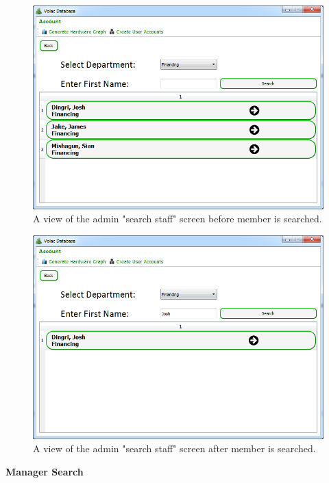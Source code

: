 \begin{figure}[H]
    \includegraphics[width=\textwidth]{./Evaluation/Images/beforeadv.png}
    \caption{A view of the admin "search staff" screen before member is searched.} 
\end{figure}

\begin{figure}[H]
    \includegraphics[width=\textwidth]{./Evaluation/Images/afteradv.png}
    \caption{A view of the admin "search staff" screen after member is searched.} 
\end{figure}

\textbf{Manager Search}

